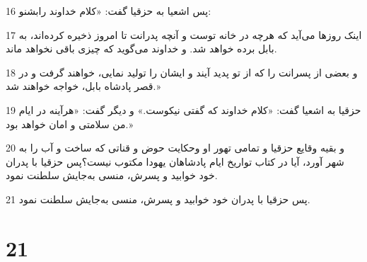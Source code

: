 \par 16 پس اشعیا به حزقیا گفت: «کلام خداوند رابشنو:
\par 17 اینک روزها می‌آید که هرچه در خانه توست و آنچه پدرانت تا امروز ذخیره کرده‌اند، به بابل برده خواهد شد. و خداوند می‌گوید که چیزی باقی نخواهد ماند.
\par 18 و بعضی از پسرانت را که از تو پدید آیند و ایشان را تولید نمایی، خواهند گرفت و در قصر پادشاه بابل، خواجه خواهند شد.»
\par 19 حزقیا به اشعیا گفت: «کلام خداوند که گفتی نیکوست.» و دیگر گفت: «هرآینه در ایام من سلامتی و امان خواهد بود.»
\par 20 و بقیه وقایع حزقیا و تمامی تهور او وحکایت حوض و قناتی که ساخت و آب را به شهر آورد، آیا در کتاب تواریخ ایام پادشاهان یهودا مکتوب نیست؟پس حزقیا با پدران خود خوابید و پسرش، منسی به‌جایش سلطنت نمود.
\par 21 پس حزقیا با پدران خود خوابید و پسرش، منسی به‌جایش سلطنت نمود.
 
\chapter{21}


